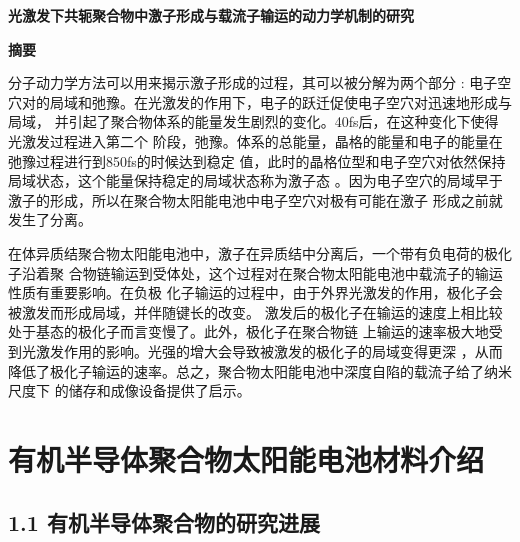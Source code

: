 \documentclass[12pt,]{report}
\date{}
\begin{document}
\vspace*{0.0cm}

\begin{center}
\Large \textbf{光激发下共轭聚合物中激子形成与载流子输运的动力学机制的研究}
\end{center}\vspace{0.54cm}\begin{center}
\Large \textbf{摘要}
\end{center}

\pagestyle{empty}

\vspace{1.5cm}

分子动力学方法可以用来揭示激子形成的过程，其可以被分解为两个部分 :
电子空穴对的局域和弛豫。在光激发的作用下，电子的跃迁促使电子空穴对迅速地形成与局域，
并引起了聚合物体系的能量发生剧烈的变化。40fs后，在这种变化下使得光激发过程进入第二个
阶段，弛豫。体系的总能量，晶格的能量和电子的能量在弛豫过程进行到850fs的时候达到稳定
值，此时的晶格位型和电子空穴对依然保持局域状态，这个能量保持稳定的局域状态称为激子态
。因为电子空穴的局域早于激子的形成，所以在聚合物太阳能电池中电子空穴对极有可能在激子
形成之前就发生了分离。

在体异质结聚合物太阳能电池中，激子在异质结中分离后，一个带有负电荷的极化子沿着聚
合物链输运到受体处，这个过程对在聚合物太阳能电池中载流子的输运性质有重要影响。在负极
化子输运的过程中，由于外界光激发的作用，极化子会被激发而形成局域，并伴随键长的改变。
激发后的极化子在输运的速度上相比较处于基态的极化子而言变慢了。此外，极化子在聚合物链
上输运的速率极大地受到光激发作用的影响。光强的增大会导致被激发的极化子的局域变得更深
，从而降低了极化子输运的速率。总之，聚合物太阳能电池中深度自陷的载流子给了纳米尺度下
的储存和成像设备提供了启示。

\clearpage
 \cleardoublepage
{} \tableofcontents
\cleardoublepage
{}

\chapter{有机半导体聚合物太阳能电池材料介绍}\label{ux6709ux673aux534aux5bfcux4f53ux805aux5408ux7269ux592aux9633ux80fdux7535ux6c60ux6750ux6599ux4ecbux7ecd}

\lhead{}  \rhead{}

\section{1.1
有机半导体聚合物的研究进展}\label{ux6709ux673aux534aux5bfcux4f53ux805aux5408ux7269ux7684ux7814ux7a76ux8fdbux5c55}
\end{document}
